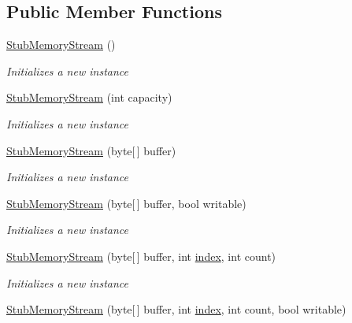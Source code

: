 \subsection*{Public Member Functions}
\begin{DoxyCompactItemize}
\item 
\hyperlink{class_system_1_1_i_o_1_1_fakes_1_1_stub_memory_stream_a7b4e9479bba21c430afee3bee913446c}{Stub\-Memory\-Stream} ()
\begin{DoxyCompactList}\small\item\em Initializes a new instance\end{DoxyCompactList}\item 
\hyperlink{class_system_1_1_i_o_1_1_fakes_1_1_stub_memory_stream_af491e7f9577bdddf7070ddcfff9cd596}{Stub\-Memory\-Stream} (int capacity)
\begin{DoxyCompactList}\small\item\em Initializes a new instance\end{DoxyCompactList}\item 
\hyperlink{class_system_1_1_i_o_1_1_fakes_1_1_stub_memory_stream_ac8edfd3275c52d221d6ae9b59ab7d0aa}{Stub\-Memory\-Stream} (byte\mbox{[}$\,$\mbox{]} buffer)
\begin{DoxyCompactList}\small\item\em Initializes a new instance\end{DoxyCompactList}\item 
\hyperlink{class_system_1_1_i_o_1_1_fakes_1_1_stub_memory_stream_a8f17eafaf3339f78884e3d95db570dea}{Stub\-Memory\-Stream} (byte\mbox{[}$\,$\mbox{]} buffer, bool writable)
\begin{DoxyCompactList}\small\item\em Initializes a new instance\end{DoxyCompactList}\item 
\hyperlink{class_system_1_1_i_o_1_1_fakes_1_1_stub_memory_stream_a9c18c1aeaf40cddfb86bcea637c70119}{Stub\-Memory\-Stream} (byte\mbox{[}$\,$\mbox{]} buffer, int \hyperlink{jquery-1_810_82-vsdoc_8js_a75bb12d1f23302a9eea93a6d89d0193e}{index}, int count)
\begin{DoxyCompactList}\small\item\em Initializes a new instance\end{DoxyCompactList}\item 
\hyperlink{class_system_1_1_i_o_1_1_fakes_1_1_stub_memory_stream_abf4e9dfa17b384373faed7c4e6ec06a5}{Stub\-Memory\-Stream} (byte\mbox{[}$\,$\mbox{]} buffer, int \hyperlink{jquery-1_810_82-vsdoc_8js_a75bb12d1f23302a9eea93a6d89d0193e}{index}, int count, bool writable)

\end{DoxyCompactItemize}
